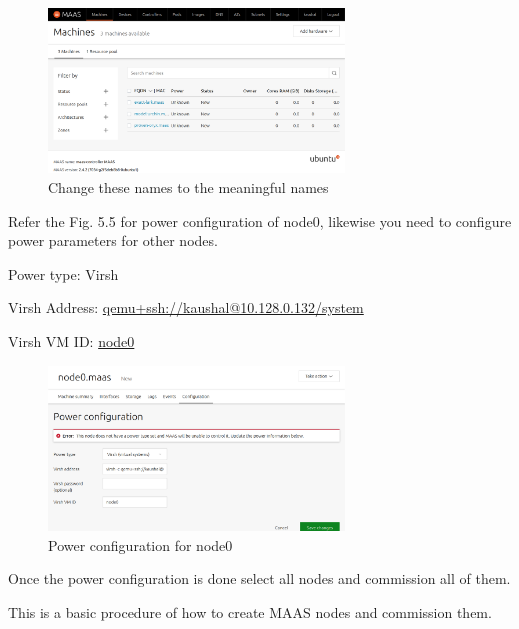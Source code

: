 \begin{figure}[!ht]
    \centering
    \includegraphics[width=0.7\textwidth]{images/5-4.png}
    \caption{Change these names to the meaningful names}
\end{figure}

Refer the Fig. 5.5 for power configuration of node0, likewise you need to configure power parameters for other nodes.

Power type: Virsh

Virsh Address: \url{qemu+ssh://kaushal@10.128.0.132/system}

Virsh VM ID: \url{node0}

\begin{figure}[!ht]
    \centering
    \includegraphics[width=0.7\textwidth]{images/5-5.png}
    \caption{Power configuration for node0}
\end{figure}

Once the power configuration is done select all nodes and commission all of them.

This is a basic procedure of how to create MAAS nodes and commission them.